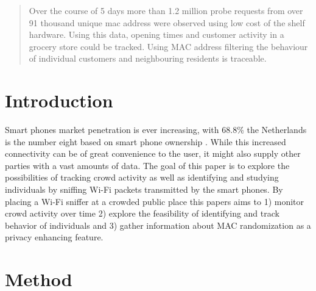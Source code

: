\documentclass[conference,compsoc]{IEEEtran}
\begin{document}




\maketitle

\begin{abstract}
Over the course of 5 days more than 1.2 million probe requests from over 91 thousand unique mac address were observed using low cost of the shelf hardware. Using this data, opening times and customer activity in a grocery store could be tracked. Using MAC address filtering the behaviour of individual customers and neighbouring residents is traceable.

\end{abstract}


%
\IEEEpeerreviewmaketitle

\section{Introduction} 
Smart phones market penetration is ever increasing, with 68.8\% the Netherlands is the number eight based on smart phone ownership \cite{SmartPenetration}. While this increased connectivity can be of great convenience to the user, it might also supply other parties with a vast amounts of data. The goal of this paper is to explore the possibilities of tracking crowd activity as well as identifying and studying individuals by sniffing Wi-Fi packets transmitted by the smart phones. By placing a Wi-Fi sniffer at a crowded public place this papers aims to 1) monitor crowd activity over time 2) explore the feasibility of identifying and track behavior of individuals and 3) gather information about MAC randomization as a privacy enhancing feature.

\section{Method}
\end{document}
